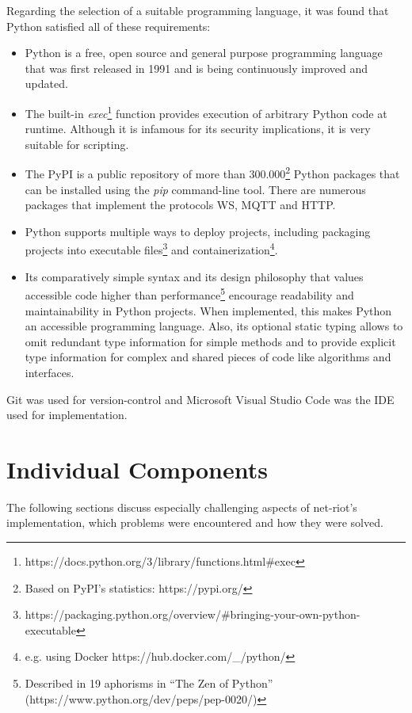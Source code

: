 Regarding the selection of a suitable programming language, it was found that Python satisfied all of these requirements:
\begin{itemize}
    \item Python is a free, open source and general purpose programming language that was first released in 1991 and is being continuously improved and updated. %
    \item The built-in \emph{exec}\footnote{https://docs.python.org/3/library/functions.html\#exec} function provides execution of arbitrary Python code at runtime. Although it is infamous for its security implications, it is very suitable for scripting.
    \item The \ac{PyPI} is a public repository of more than 300.000\footnote{Based on \ac{PyPI}'s statistics: https://pypi.org/} Python packages that can be installed using the \emph{pip} command-line tool. There are numerous packages that implement the protocols \ac{WS}, \ac{MQTT} and \ac{HTTP}.
    \item Python supports multiple ways to deploy projects, including packaging projects into executable files\footnote{https://packaging.python.org/overview/\#bringing-your-own-python-executable} and containerization\footnote{e.g. using Docker https://hub.docker.com/\_/python/}.
    \item Its comparatively simple syntax and its design philosophy that values accessible code higher than performance\footnote{Described in 19 aphorisms in \enquote{The Zen of Python} (https://www.python.org/dev/peps/pep-0020/)} encourage readability and maintainability in Python projects. When implemented, this makes Python an accessible programming language. Also, its optional static typing allows to omit redundant type information for simple methods and to provide explicit type information for complex and shared pieces of code like algorithms and interfaces.
\end{itemize}
Git was used for version-control and Microsoft Visual Studio Code was the \ac{IDE} used for implementation.


\section{Individual Components}
\label{sec:individual-components}
The following sections discuss especially challenging aspects of net-riot's implementation, which problems were encountered and how they were solved.

